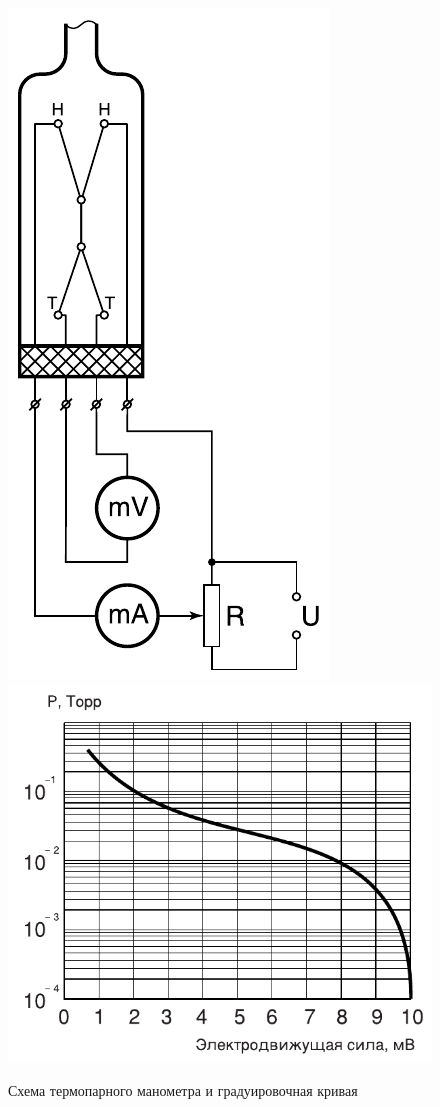 \documentclass[12pt]{article}
\begin{document}
	\begin{figure}[h!]
	\caption{Схема термопарного манометра и градуировочная кривая}
	\label{fig:scheme-tman}
	\begin{center}
	\includegraphics[scale=.6]{scheme3.png}
	\includegraphics[scale=.6]{scheme4.png}
	\end{center}
	\end{figure}
	
\end{document}
